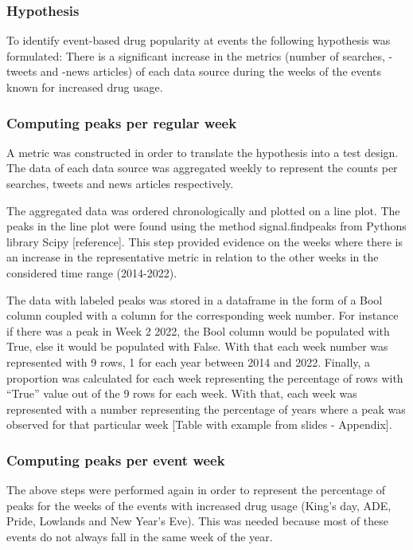 \subsubsection{Hypothesis}

To identify event-based drug popularity at events the following hypothesis was formulated:
There is a significant increase in the metrics (number of searches, -tweets and -news articles) of each data source during the weeks of the events known for increased drug usage. 

\subsubsection{Computing peaks per regular week}

A metric was constructed in order to translate the hypothesis into a test design. The data of each data source was aggregated weekly to represent the counts per searches, tweets and news articles respectively. 

The aggregated data was ordered chronologically and plotted on a line plot. The peaks in the line plot were found using the method signal.findpeaks from Pythons library Scipy [reference]. This step provided evidence on the weeks where there is an increase in the representative metric in relation to the other weeks in the considered time range (2014-2022). 

The data with labeled peaks was stored in a dataframe in the form of a Bool column coupled with a column for the corresponding week number. For instance if there was a peak in Week 2 2022, the Bool column would be populated with True, else it would be populated with False. With that each week number was represented with 9 rows, 1 for each year between 2014 and 2022. 
Finally, a proportion was calculated for each week representing the percentage of rows with “True” value out of the 9 rows for each week. With that, each week was represented with a number representing the percentage of years where a peak was observed for that particular week [Table with example from slides - Appendix]. 

\subsubsection{Computing peaks per event week}

The above steps were performed again in order to represent the percentage of peaks for the weeks of the events with increased drug usage (King’s day, ADE, Pride, Lowlands and New Year’s Eve). This was needed because most of these events do not always fall in the same week of the year.

